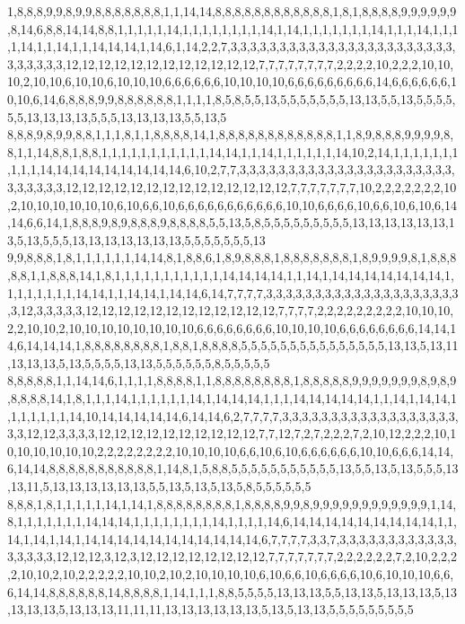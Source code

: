 1,8,8,8,9,9,8,9,9,8,8,8,8,8,8,8,1,1,14,14,8,8,8,8,8,8,8,8,8,8,8,8,1,8,1,8,8,8,8,9,9,9,9,9,9,8,14,6,8,8,14,14,8,8,1,1,1,1,1,14,1,1,1,1,1,1,1,1,14,1,14,1,1,1,1,1,1,1,14,1,1,1,14,1,1,1,1,14,1,1,14,1,1,14,14,14,1,14,6,1,14,2,2,7,3,3,3,3,3,3,3,3,3,3,3,3,3,3,3,3,3,3,3,3,3,3,3,3,3,3,3,3,3,12,12,12,12,12,12,12,12,12,12,12,12,7,7,7,7,7,7,7,7,2,2,2,2,10,2,2,2,10,10,10,2,10,10,6,10,10,6,10,10,10,6,6,6,6,6,6,10,10,10,10,6,6,6,6,6,6,6,6,6,14,6,6,6,6,6,6,10,10,6,14,6,8,8,8,9,9,8,8,8,8,8,8,1,1,1,1,8,5,8,5,5,13,5,5,5,5,5,5,5,13,13,5,5,13,5,5,5,5,5,5,13,13,13,13,5,5,5,13,13,13,13,5,5,13,5
8,8,8,9,8,9,9,8,8,1,1,1,8,1,1,8,8,8,8,14,1,8,8,8,8,8,8,8,8,8,8,8,8,1,1,8,9,8,8,8,9,9,9,9,8,8,1,1,14,8,8,1,8,8,1,1,1,1,1,1,1,1,1,1,1,14,14,1,1,14,1,1,1,1,1,1,14,10,2,14,1,1,1,1,1,1,1,1,1,1,14,14,14,14,14,14,14,14,14,6,10,2,7,7,3,3,3,3,3,3,3,3,3,3,3,3,3,3,3,3,3,3,3,3,3,3,3,3,3,3,3,3,12,12,12,12,12,12,12,12,12,12,12,12,12,12,7,7,7,7,7,7,7,10,2,2,2,2,2,2,2,10,2,10,10,10,10,10,10,6,10,6,6,10,6,6,6,6,6,6,6,6,6,6,6,10,10,6,6,6,6,10,6,6,10,6,10,6,14,14,6,6,14,1,8,8,8,9,8,9,8,8,8,9,8,8,8,8,5,5,13,5,8,5,5,5,5,5,5,5,5,5,13,13,13,13,13,13,13,5,13,5,5,5,13,13,13,13,13,13,13,5,5,5,5,5,5,5,13
9,9,8,8,8,1,8,1,1,1,1,1,1,14,14,8,1,8,8,6,1,8,9,8,8,8,1,8,8,8,8,8,8,8,1,8,9,9,9,9,8,1,8,8,8,8,8,1,1,8,8,8,14,1,8,1,1,1,1,1,1,1,1,1,1,1,14,14,14,14,1,1,14,1,14,14,14,14,14,14,14,1,1,1,1,1,1,1,1,14,14,1,1,14,14,1,14,14,6,14,7,7,7,7,3,3,3,3,3,3,3,3,3,3,3,3,3,3,3,3,3,3,3,3,3,12,3,3,3,3,3,12,12,12,12,12,12,12,12,12,12,12,12,7,7,7,7,2,2,2,2,2,2,2,2,2,10,10,10,2,2,10,10,2,10,10,10,10,10,10,10,10,6,6,6,6,6,6,6,6,10,10,10,10,6,6,6,6,6,6,6,6,14,14,14,6,14,14,14,1,8,8,8,8,8,8,8,8,1,8,8,1,8,8,8,8,5,5,5,5,5,5,5,5,5,5,5,5,5,5,5,13,13,5,13,11,13,13,13,5,13,5,5,5,5,13,13,5,5,5,5,5,5,8,5,5,5,5,5
8,8,8,8,8,1,1,14,14,6,1,1,1,1,8,8,8,8,1,1,8,8,8,8,8,8,8,8,1,8,8,8,8,8,9,9,9,9,9,9,9,8,9,8,9,8,8,8,8,14,1,8,1,1,1,14,1,1,1,1,1,1,14,1,14,14,14,1,1,1,14,14,14,14,14,1,1,14,1,14,14,1,1,1,1,1,1,1,14,10,14,14,14,14,14,6,14,14,6,2,7,7,7,7,3,3,3,3,3,3,3,3,3,3,3,3,3,3,3,3,3,3,3,3,12,12,3,3,3,3,12,12,12,12,12,12,12,12,12,12,7,7,12,7,2,7,2,2,2,7,2,10,12,2,2,2,10,10,10,10,10,10,10,2,2,2,2,2,2,2,2,10,10,10,10,6,6,10,6,10,6,6,6,6,6,6,10,10,6,6,6,14,14,6,14,14,8,8,8,8,8,8,8,8,8,8,8,1,14,8,1,5,8,8,5,5,5,5,5,5,5,5,5,5,5,13,5,5,13,5,13,5,5,5,13,13,11,5,13,13,13,13,13,13,5,5,13,5,13,5,13,5,8,5,5,5,5,5,5
8,8,8,1,8,1,1,1,1,1,14,1,14,1,8,8,8,8,8,8,8,8,1,8,8,8,8,9,9,8,9,9,9,9,9,9,9,9,9,9,9,9,1,14,8,1,1,1,1,1,1,1,14,14,14,1,1,1,1,1,1,1,1,14,1,1,1,1,14,6,14,14,14,14,14,14,14,14,14,1,1,14,1,14,1,14,1,14,14,14,14,14,14,14,14,14,14,14,6,7,7,7,7,3,3,7,3,3,3,3,3,3,3,3,3,3,3,3,3,3,3,3,3,12,12,12,3,12,3,12,12,12,12,12,12,12,12,7,7,7,7,7,7,7,2,2,2,2,2,2,7,2,10,2,2,2,2,10,10,2,10,2,2,2,2,2,10,10,2,10,2,10,10,10,10,6,10,6,6,10,6,6,6,6,10,6,10,10,10,6,6,6,14,14,8,8,8,8,8,8,14,8,8,8,8,1,14,1,1,1,8,8,5,5,5,5,13,13,13,5,5,13,13,5,13,13,13,5,13,13,13,13,5,13,13,13,11,11,11,13,13,13,13,13,13,5,13,5,13,13,5,5,5,5,5,5,5,5,5
